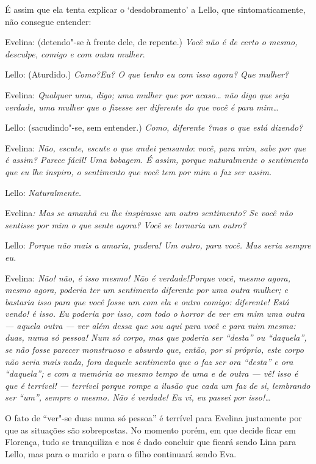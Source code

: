 É assim que ela tenta explicar o `desdobramento' a Lello, que
sintomaticamente, não consegue entender:

Evelina: (detendo"-se à frente dele, de repente.) \emph{Você não é de
certo o mesmo, desculpe, comigo e com outra mulher}.

Lello: (Aturdido.) \emph{Como?Eu? O que tenho eu com isso agora? Que
mulher?}

Evelina: \emph{Qualquer uma, digo; uma mulher que por acaso\ldots{} não digo
que seja verdade, uma mulher que o fizesse ser diferente do que você é
para mim\ldots{}}

Lello: (sacudindo"-se, sem entender.) \emph{Como, diferente ?mas o que
está dizendo?}

Evelina: \emph{Não, escute, escute o que andei pensando}: \emph{você,
para mim, sabe por que é assim? Parece fácil! Uma bobagem. É assim,
porque naturalmente o sentimento que eu lhe inspiro, o sentimento que
você tem por mim o faz ser assim. }

Lello: \emph{Naturalmente.}

Evelina\emph{: Mas se amanhã eu lhe inspirasse um outro sentimento? Se
você não sentisse por mim o que sente agora? Você se tornaria um outro?}

Lello: \emph{Porque não mais a amaria, pudera! Um outro, para você. Mas
seria sempre eu. }

Evelina: \emph{Não! não, é isso mesmo! Não é verdade!Porque você, mesmo
agora, mesmo agora, poderia ter um sentimento diferente por uma outra
mulher; e bastaria isso para que você fosse um com ela e outro comigo:
diferente! Está vendo! é isso. Eu poderia por isso, com todo o horror de
ver em mim uma outra --- aquela outra --- ver além dessa que sou aqui para
você e para mim mesma: duas, numa só pessoa! Num só corpo, mas que
poderia ser ``desta'' ou ``daquela'', se não fosse parecer}
\emph{monstruoso e absurdo que, então, por si próprio, este corpo não
seria mais nada, fora daquele sentimento que o faz ser ora ``desta'' e
ora ``daquela''; e com a memória ao mesmo tempo de uma e de outra --- vê!
isso é que é terrível! --- terrível porque rompe a ilusão que cada um faz
de si, lembrando ser ``um'', sempre o mesmo. Não é verdade! Eu vi, eu
passei por isso!\ldots{}}

O fato de ``ver"-se duas numa só pessoa'' é terrível para Evelina
justamente por que as situações são sobrepostas. No momento porém, em
que decide ficar em Florença, tudo se tranquiliza e nos é dado concluir
que ficará sendo Lina para Lello, mas para o marido e para o filho
continuará sendo Eva.

